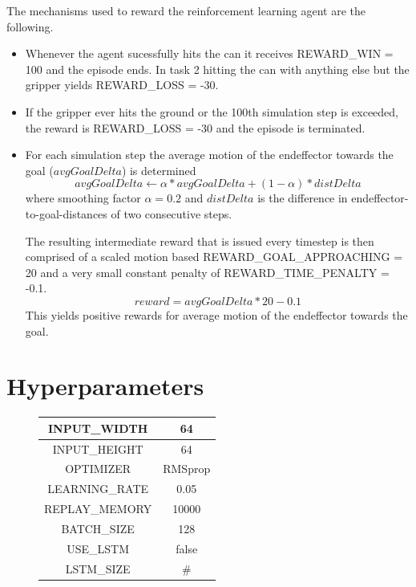 \documentclass[10pt,journal,compsoc]{IEEEtran}
\begin{document}
The mechanisms used to reward the reinforcement learning agent are the following.
\begin{itemize}

    \item Whenever the agent sucessfully hits the can it receives REWARD\_WIN = 100 and the episode ends. In task 2 hitting the can with anything else but the gripper yields REWARD\_LOSS = -30.

    \item If the gripper ever hits the ground or the 100th simulation step is exceeded, the reward is REWARD\_LOSS = -30 and the episode is terminated.

    \item For each simulation step the average motion of the endeffector towards the goal ($avgGoalDelta$) is determined
    $$ avgGoalDelta \leftarrow \alpha * avgGoalDelta + (1 - \alpha) * distDelta $$
    where smoothing factor $\alpha = 0.2$ and $distDelta$ is the difference in endeffector-to-goal-distances of two consecutive steps.

    The resulting intermediate reward  that is issued every timestep is then comprised of a scaled motion based REWARD\_GOAL\_APPROACHING = 20 and a very small constant penalty of REWARD\_TIME\_PENALTY = -0.1.
    $$ reward = avgGoalDelta * 20 - 0.1 $$
    This yields positive rewards for average motion of the endeffector towards the goal.

\end{itemize}

\section{Hyperparameters}  

\begin{figure}[thpb]
    \centering
    \begin{tabular}{|c|c|}\hline
        INPUT\_WIDTH  & 64  \\ \hline
        INPUT\_HEIGHT & 64  \\ \hline
        OPTIMIZER & RMSprop  \\ \hline
        LEARNING\_RATE & 0.05 \\ \hline
        REPLAY\_MEMORY & 10000  \\ \hline
        BATCH\_SIZE & 128  \\ \hline
        USE\_LSTM & false  \\ \hline
        LSTM\_SIZE & \# \\ \hline
    \end{tabular}
\end{figure}
\end{document}
